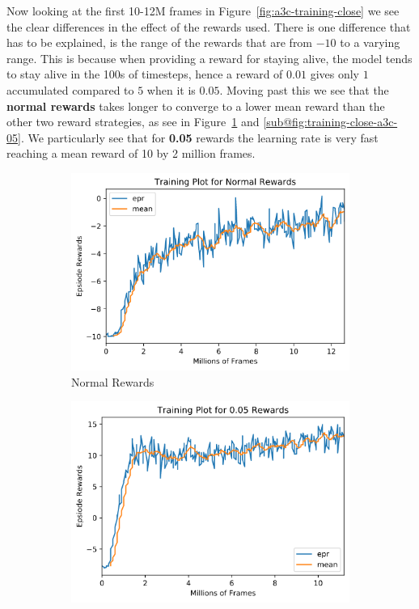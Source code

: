 Now looking at the first 10-12M frames in Figure~\ref{fig:a3c-training-close} we see the clear differences in the effect of the rewards used. There is one difference that has to be explained, is the range of the rewards that are from $-10$ to a varying range. This is because when providing a reward for staying alive, the model tends to stay alive in the 100s of timesteps, hence a reward of $0.01$ gives only $1$ accumulated compared to $5$ when it is $0.05$. Moving past this we see that the \textbf{normal rewards} takes longer to converge to a lower mean reward than the other two reward strategies, as see in Figure~\ref{fig:training-close-a3c-normal} and \ref{sub@fig:training-close-a3c-05}. We particularly see that for \textbf{0.05} rewards the learning rate is very fast reaching a mean reward of 10 by 2 million frames. 
\begin{figure}[ht!]
    \centering
    \begin{subfigure}{0.49\textwidth}
        \centering
        \includegraphics[width=\textwidth]{figures/a3c-training-normal_close.png}
        \caption{Normal Rewards}
        \label{fig:training-close-a3c-normal}
    \end{subfigure}
    \begin{subfigure}{0.49\textwidth}
        \centering
        \includegraphics[width=\textwidth]{figures/a3c-training-0-05_close.png}

\end{subfigure}
\end{figure}
